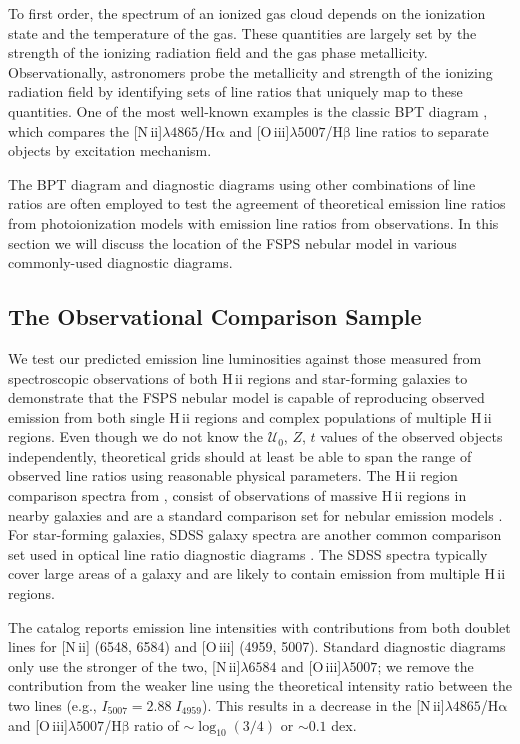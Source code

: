 \documentclass[twocolumn, tighten]{aastex61}
\newcommand{\FSPS}{{\sc FSPS}\xspace}
\newcommand{\logten}{\ensuremath{\log_{10}}}
\newcommand{\nii}{[N\,{\sc ii}]\xspace}
\newcommand{\oiii}{[O\,{\sc iii}]\xspace}
\newcommand{\ha}{\ensuremath{\mathrm{H\alpha}}}
\newcommand{\hb}{\ensuremath{\mathrm{H\beta}}}
\newcommand{\hii}{H\,{\sc ii}\xspace}
\newcommand\lam[1]{\ensuremath{\lambda #1}}
\newcommand{\U}{\ensuremath{\mathcal{U}_{0}}}
\newcommand\niiha{\nii{}\lam{4865}/\ha{}}
\newcommand\oiiihb{\oiii{}\lam{5007}/\hb{}}
\begin{document}
To first order, the spectrum of an ionized gas cloud depends on the ionization state and the temperature of the gas. These quantities are largely set by the strength of the ionizing radiation field and the gas phase metallicity. Observationally, astronomers probe the metallicity and strength of the ionizing radiation field by identifying sets of line ratios that uniquely  map to these quantities. One of the most well-known examples is the classic BPT diagram \citep{BPT}, which compares the \niiha{} and \oiiihb{} line ratios to separate objects by excitation mechanism.

The BPT diagram and diagnostic diagrams using other combinations of line ratios are often employed to test the agreement of theoretical emission line ratios from photoionization models with emission line ratios from observations. In this section we will discuss the location of the \FSPS nebular model in various commonly-used diagnostic diagrams.

\subsection{The Observational Comparison Sample}

We test our predicted emission line luminosities against those measured from spectroscopic observations of both \hii regions and star-forming galaxies to demonstrate that the \FSPS nebular model is capable of reproducing observed emission from both single \hii regions and complex populations of multiple \hii regions. Even though we do not know the \U{}, $Z$, $t$ values of the observed objects independently, theoretical grids should at least be able to span the range of observed line ratios using reasonable physical parameters.  The \hii region comparison spectra from \citet{vanzee98}, consist of observations of massive \hii regions in nearby galaxies and are a standard comparison set for nebular emission models \citep{Dopita00, Kewley06, Levesque10, Dopita13}. For star-forming galaxies, SDSS galaxy spectra are another common comparison set used in optical line ratio diagnostic diagrams \citep{Dopita00, Kewley06, Levesque10}. The SDSS spectra typically cover large areas of a galaxy and are likely to contain emission from multiple \hii regions.

The \citet{vanzee98} catalog reports emission line intensities with contributions from both doublet lines for \nii{} (6548, 6584) and \oiii{} (4959, 5007). Standard diagnostic diagrams only use the stronger of the two, \nii{}\lam{6584} and \oiii{}\lam{5007}; we remove the contribution from the weaker line using the theoretical intensity ratio between the two lines (e.g., $I_{5007} = 2.88\;I_{4959}$). This results in a decrease in the \niiha{} and \oiiihb{} ratio of $\sim \logten \left(3/4\right)$ or $\sim 0.1$ dex.
\end{document}
